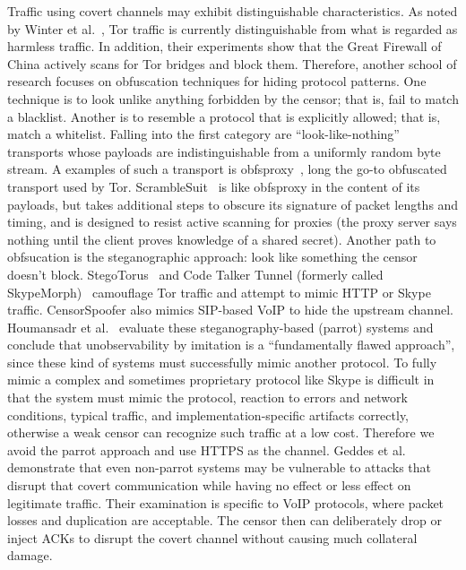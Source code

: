 \documentclass{article}  usepackage{url}
\begin{document}
Traffic using covert channels may exhibit distinguishable characteristics. As
noted by Winter et al.~\cite{foci12-winter}, Tor traffic is currently
distinguishable from what is regarded as harmless traffic. In addition, their
experiments show that the Great Firewall of China actively scans for Tor bridges
and block them. Therefore, another school of research focuses on obfuscation
techniques for hiding protocol patterns. One technique is to look unlike
anything forbidden by the censor; that is, fail to match a blacklist. Another is
to resemble a protocol that is explicitly allowed; that is, match a whitelist.
Falling into the first category are ``look-like-nothing'' transports whose
payloads are indistinguishable from a uniformly random byte stream. A examples
of such a transport is obfsproxy~\cite{obfsproxy}, long the go-to obfuscated
transport used by Tor. ScrambleSuit~\cite{scramblesuit} is like obfsproxy in the
content of its payloads, but takes additional steps to obscure its signature of
packet lengths and timing, and is designed to resist active scanning for proxies
(the proxy server says nothing until the client proves knowledge of a shared
secret). Another path to obfsucation is the steganographic approach: look like
something the censor doesn't block. StegoTorus~\cite{stegotorus} and Code Talker
Tunnel (formerly called SkypeMorph)~\cite{skypemorph} camouflage Tor traffic and
attempt to mimic HTTP or Skype traffic. CensorSpoofer also mimics SIP-based VoIP
to hide the upstream channel.\\

Houmansadr et al.~\cite{parrot} evaluate these steganography-based (parrot)
systems and conclude that unobservability by imitation is a ``fundamentally
flawed approach'', since these kind of systems must successfully mimic another
protocol. To fully mimic a complex and sometimes proprietary protocol like Skype
is difficult in that the system must mimic the protocol,  reaction to errors and
network conditions, typical traffic, and implementation-specific artifacts
correctly, otherwise a weak censor can recognize such traffic at a low cost.
Therefore we avoid the parrot approach and use HTTPS as the channel. Geddes et
al.~\cite{acks} demonstrate that even non-parrot systems may be vulnerable to
attacks that disrupt that covert communication while having no effect or less
effect on legitimate traffic. Their examination is specific to VoIP protocols,
where packet losses and duplication are acceptable. The censor then can
deliberately drop or inject ACKs to disrupt the covert channel without causing
much collateral damage.\\
\end{document}
